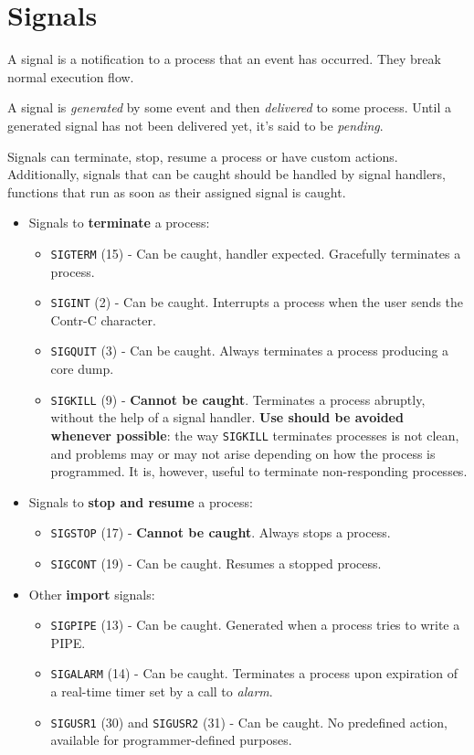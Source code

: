 \documentclass{article}
\begin{document}
\section{Signals}

A signal is a notification to a process that an event has occurred. They break normal execution flow.

A signal is \textit{generated} by some event and then \textit{delivered} to some process. Until a generated signal has not been delivered yet, it's said to be \textit{pending}.

Signals can terminate, stop, resume a process or have custom actions. Additionally, signals that can be caught should be handled by signal handlers, functions that run as soon as their assigned signal is caught.

\begin{itemize}
    \item Signals to \textbf{terminate} a process:
        \begin{itemize}
            \item \texttt{SIGTERM} (15) - Can be caught, handler expected. Gracefully terminates a process.
            \item \texttt{SIGINT} (2) - Can be caught. Interrupts a process when the user sends the Contr-C character.
            \item \texttt{SIGQUIT} (3) - Can be caught. Always terminates a process producing a core dump.
            \item \texttt{SIGKILL} (9) - \textbf{Cannot be caught}. Terminates a process abruptly, without the help of a signal handler. \textbf{Use should be avoided whenever possible}: the way \texttt{SIGKILL} terminates processes is not clean, and problems may or may not arise depending on how the process is programmed. It is, however, useful to terminate non-responding processes.
        \end{itemize}
    \item Signals to \textbf{stop and resume} a process:
        \begin{itemize}
            \item \texttt{SIGSTOP} (17) - \textbf{Cannot be caught}. Always stops a process.
            \item \texttt{SIGCONT} (19) - Can be caught. Resumes a stopped process.
        \end{itemize}
    \item Other \textbf{import} signals:
        \begin{itemize}
            \item \texttt{SIGPIPE} (13) - Can be caught. Generated when a process tries to write a PIPE.
            \item \texttt{SIGALARM} (14) - Can be caught. Terminates a process upon expiration of a real-time timer set by a call to \textit{alarm}.
            \item \texttt{SIGUSR1} (30) and \texttt{SIGUSR2} (31) - Can be caught. No predefined action, available for programmer-defined purposes.
        \end{itemize}
\end{itemize}
\end{document}
